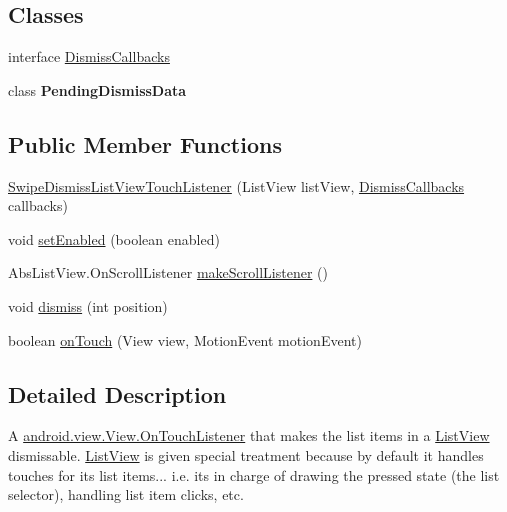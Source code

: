 \subsection*{Classes}
\begin{DoxyCompactItemize}
\item 
interface \hyperlink{interfaceandroid_1_1app_1_1printerapp_1_1history_1_1_swipe_dismiss_list_view_touch_listener_1_1_dismiss_callbacks}{Dismiss\+Callbacks}
\item 
class {\bfseries Pending\+Dismiss\+Data}
\end{DoxyCompactItemize}
\subsection*{Public Member Functions}
\begin{DoxyCompactItemize}
\item 
\hyperlink{classandroid_1_1app_1_1printerapp_1_1history_1_1_swipe_dismiss_list_view_touch_listener_ad9370912c19e4ac87d03c71814b4a612}{Swipe\+Dismiss\+List\+View\+Touch\+Listener} (List\+View list\+View, \hyperlink{interfaceandroid_1_1app_1_1printerapp_1_1history_1_1_swipe_dismiss_list_view_touch_listener_1_1_dismiss_callbacks}{Dismiss\+Callbacks} callbacks)
\item 
void \hyperlink{classandroid_1_1app_1_1printerapp_1_1history_1_1_swipe_dismiss_list_view_touch_listener_aa158267502b577998675a6ce92319818}{set\+Enabled} (boolean enabled)
\item 
Abs\+List\+View.\+On\+Scroll\+Listener \hyperlink{classandroid_1_1app_1_1printerapp_1_1history_1_1_swipe_dismiss_list_view_touch_listener_a8cff088047f50f3b22379d5a1f40ff8a}{make\+Scroll\+Listener} ()
\item 
void \hyperlink{classandroid_1_1app_1_1printerapp_1_1history_1_1_swipe_dismiss_list_view_touch_listener_aa65381086b90f5b0b1117956ebc57daf}{dismiss} (int position)
\item 
boolean \hyperlink{classandroid_1_1app_1_1printerapp_1_1history_1_1_swipe_dismiss_list_view_touch_listener_ade17676e25aa6e39a8d12882d5fd5935}{on\+Touch} (View view, Motion\+Event motion\+Event)
\end{DoxyCompactItemize}


\subsection{Detailed Description}
A \hyperlink{}{android.\+view.\+View.\+On\+Touch\+Listener} that makes the list items in a \hyperlink{}{List\+View} dismissable. \hyperlink{}{List\+View} is given special treatment because by default it handles touches for its list items... i.\+e. it\textquotesingle{}s in charge of drawing the pressed state (the list selector), handling list item clicks, etc.


